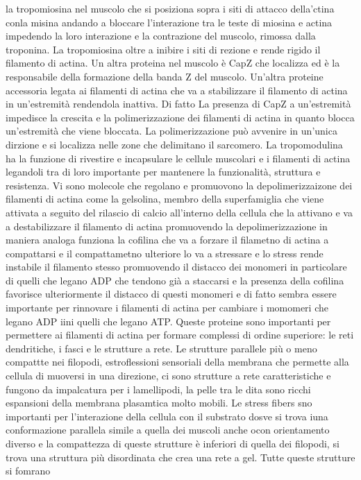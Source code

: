 la tropomiosina nel muscolo che si posiziona sopra i siti di attacco della'ctina conla misina andando a bloccare l'interazione tra le teste di miosina e actina impedendo la loro 
interazione e la contrazione del muscolo, rimossa dalla troponina. La tropomiosina oltre a inibire i siti di rezione e rende rigido il filamento di actina. Un altra proteina nel
muscolo \`e CapZ che localizza ed \`e la responsabile della formazione della banda Z del muscolo. Un'altra proteine accessoria legata ai filamenti di actina che va a stabilizzare il 
filamento di actina in un'estremit\`a rendendola inattiva. Di fatto La presenza di CapZ a un'estremit\`a impedisce la crescita e la polimerizzazione dei filamenti di actina in quanto
blocca un'estremit\`a che viene bloccata. La polimerizzazione pu\`o avvenire in un'unica dirzione e si localizza nelle zone che delimitano il sarcomero. La tropomodulina ha la funzione
di rivestire e incapsulare le cellule muscolari e i filamenti di actina legandoli tra di loro importante per mantenere la funzionalit\`a, struttura e resistenza. Vi sono molecole che
regolano e promuovono la depolimerizzaizone dei filamenti di actina come la gelsolina, membro della superfamiglia che viene attivata a seguito del rilascio di calcio all'interno della
cellula che la attivano e va a destabilizzare il filamento di actina promuovendo la depolimerizzazione in maniera analoga funziona la cofilina che va a forzare il filametno di actina a 
compattarsi e il compattametno ulteriore lo va a stressare e lo stress rende instabile il filamento stesso promuovendo il distacco dei monomeri in particolare di quelli che legano ADP 
che tendono gi\`a a staccarsi e la presenza della cofilina favorisce ulteriormente il distacco di questi monomeri e di fatto sembra essere importante per rinnovare i filamenti di
actina per cambiare i momomeri che legano ADP iini quelli che legano ATP. Queste proteine sono importanti per permettere ai filamenti di actina per formare complessi di ordine superiore:
le reti dendritiche, i fasci e le strutture a rete. Le strutture parallele pi\`u o meno compattte nei filopodi, estroflessioni sensoriali della membrana che permette alla cellula di 
muoversi in una direzione, ci sono strutture a rete caratteristiche e fungono da impalcatura per i lamellipodi, la pelle tra le dita sono ricchi espansioni della membrana plasamtica molto
mobili. Le stress fibers sno importanti per l'interazione della cellula con il substrato dosve si trova iuna conformazione parallela simile a quella dei muscoli anche ocon orientamento
diverso e la compattezza di queste strutture \`e inferiori di quella dei filopodi, si trova una struttura pi\`u disordinata che crea una rete a gel. Tutte queste strutture si fomrano
